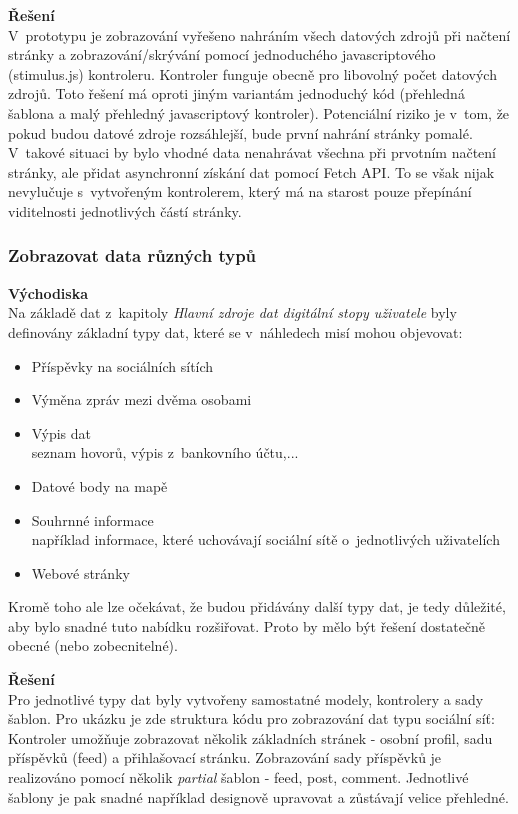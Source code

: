	\textbf{Řešení}\\
	V~prototypu je zobrazování vyřešeno nahráním všech datových zdrojů při načtení stránky a zobrazování/skrývání pomocí jednoduchého javascriptového (stimulus.js) kontroleru. Kontroler funguje obecně pro libovolný počet datových zdrojů.
	Toto řešení má oproti jiným variantám jednoduchý kód (přehledná šablona a malý přehledný javascriptový kontroler).
	Potenciální riziko je v~tom, že pokud budou datové zdroje rozsáhlejší, bude první nahrání stránky pomalé. V~takové situaci by bylo vhodné data nenahrávat všechna při prvotním načtení stránky, ale přidat asynchronní získání dat pomocí Fetch API. To se však nijak nevylučuje s~vytvořeným kontrolerem, který má na starost pouze přepínání viditelnosti jednotlivých částí stránky.

\subsubsection*{Zobrazovat data různých typů}
	\textbf{Východiska}\\
	Na základě dat z~kapitoly \textit{Hlavní zdroje dat digitální stopy uživatele} byly definovány základní typy dat, které se v~náhledech misí mohou objevovat:

	\begin{itemize}
		\item Příspěvky na sociálních sítích
		\item Výměna zpráv mezi dvěma osobami
		\item Výpis dat\\
			seznam hovorů, výpis z~bankovního účtu,...
		\item Datové body na mapě
		\item Souhrnné informace\\
			například informace, které uchovávají sociální sítě o~jednotlivých uživatelích
		\item Webové stránky
	\end{itemize}

	Kromě toho ale lze očekávat, že budou přidávány další typy dat, je tedy důležité, aby bylo snadné tuto nabídku rozšiřovat.
	Proto by mělo být řešení dostatečně obecné (nebo zobecnitelné). 

	\textbf{Řešení}\\
	Pro jednotlivé typy dat byly vytvořeny samostatné modely, kontrolery a sady šablon. Pro ukázku je zde struktura kódu pro zobrazování dat typu sociální síť:\\
	Kontroler umožňuje zobrazovat několik základních stránek - osobní profil, sadu příspěvků (feed) a přihlašovací stránku.
	Zobrazování sady příspěvků je realizováno pomocí několik \textit{partial} šablon - feed, post, comment. Jednotlivé šablony je pak snadné například designově upravovat a zůstávají velice přehledné.

